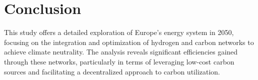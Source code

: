 \documentclass[twocolumn]{article}
\newcommand{\COtwo}{CO$_2$}
\newcommand{\Htwo}{H$_2$}
\begin{document}


\section{Conclusion}
\label{sec:conclusion}

This study offers a detailed exploration of Europe's energy system in 2050, focusing on the integration and optimization of hydrogen and carbon networks to achieve climate neutrality. The analysis reveals significant efficiencies gained through these networks, particularly in terms of leveraging low-cost carbon sources and facilitating a decentralized approach to carbon utilization.
\end{document}

